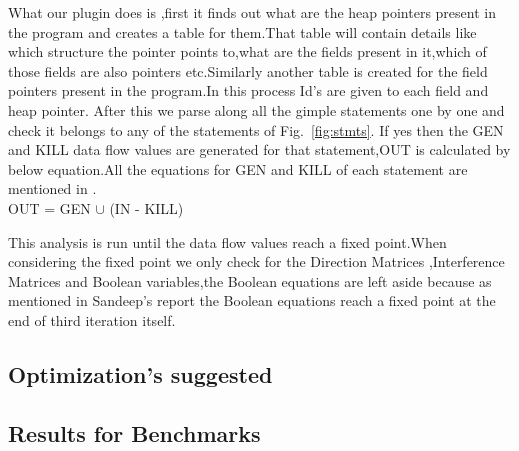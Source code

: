    What our plugin does is ,first it finds out what are the heap pointers present in the program and creates a table for
them.That table will contain details like which structure the pointer points to,what are the fields present
in it,which of those fields are also pointers etc.Similarly another table is created for the field pointers
present in the program.In this process Id's are given to each field and heap pointer.
After this we parse along all the gimple statements one by one and check it belongs to any of the statements of Fig.~\ref{fig:stmts}.
 If yes then the GEN and KILL data flow values are generated for that statement,OUT is calculated by below equation.All the
equations for GEN and KILL of each statement are mentioned in \cite{Sandeep}.\\

OUT = GEN $\cup$ (IN - KILL) 

  This analysis is run until the data flow values reach a fixed point.When considering the fixed point we only check for
the Direction Matrices ,Interference Matrices and Boolean variables,the Boolean equations are left aside because as
mentioned in Sandeep's report \cite{Sandeep11thesis} the Boolean equations reach a fixed point at the end of 
third iteration itself.
\subsection{Optimization's suggested}
\subsection{Results for Benchmarks}

